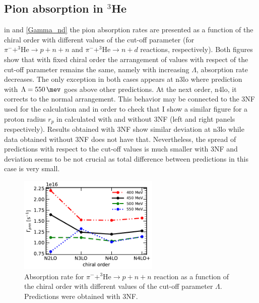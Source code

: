     \subsection{Pion absorption in $^3$He}

    in  and \ref{Gamma_nd} the pion absorption rates are presented as a function
    of the chiral order with different values of the cut-off parameter
    (for $\pi^- + ^3\text{He} \rightarrow p + n + n$ and $\pi^- + ^3\text{He} \rightarrow n + d$ reactions, respectively).
    Both figures show that with fixed chiral order the arrangement of values with respect of the cut-off parameter
    remains the same, namely with increasing $\Lambda$, absorption rate decreases. The only exception in both cases 
    appears at \gls{n3lo} where prediction with $\Lambda = \SI{550}{\mev}$ goes above other predictions.
    At the next order, \gls{n4lo}, it corrects to the normal arrangement.
    This behavior may be connected to the 3NF used for the calculation and in order to check that I show
    a similar figure for a proton radius $r_p$ in  calculated with 
    and without 3NF (left and right panels respectively). Results obtained with 3NF show
    similar deviation at \gls{n3lo} while data obtained without 3NF does not have that.
    Nevertheless, the spread of predictions with respect to the cut-off values is much smaller
    with 3NF and deviation seems to be not crucial as total difference
    between predictions in this case is very small.




    \begin{figure}[h]
        \begin{center}
        \includegraphics[width=0.6\textwidth]{PlotData/PION/Dalitz_maps/figures/Gamma_pnn.pdf}
        \end{center}
        \caption{Absorption rate for $\pi^- + ^3\text{He} \rightarrow p + n + n$ reaction as a function
        of the chiral order with different values of the cut-off parameter $\Lambda$.
        Predictions were obtained with 3NF.}
        \label{Gamma_pnn}
    \end{figure}

